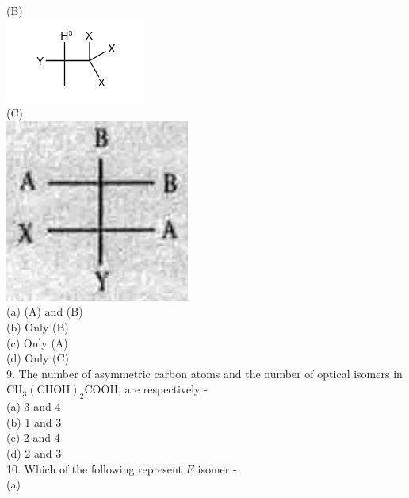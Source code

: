 \documentclass[10pt]{article}
\begin{document}
(B)\\
\includegraphics{smile-e27168e63df1558c0cf0ec14bd88fa6b5990b8e9}\\
(C)\\
\includegraphics[max width=\textwidth, center]{2025_01_28_8470952b98110cec3aabg-064(1)}\\
(a) (A) and (B)\\
(b) Only (B)\\
(c) Only (A)\\
(d) Only (C)\\
9. The number of asymmetric carbon atoms and the number of optical isomers in $\mathrm{CH}_{3}(\mathrm{CHOH})_{2} \mathrm{COOH}$, are respectively -\\
(a) 3 and 4\\
(b) 1 and 3\\
(c) 2 and 4\\
(d) 2 and 3\\
10. Which of the following represent $E$ isomer -\\
(a)\\
\end{document}

